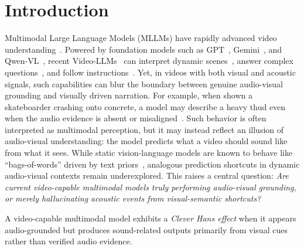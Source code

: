 \documentclass{llmxive}
\begin{document}
\section{Introduction}
\vspace{-0.5em}
Multimodal Large Language Models (MLLMs) have rapidly advanced video understanding~\cite{DBLP:conf/emnlp/LinYZCNJ024, DBLP:conf/acl/0001RKK24, DBLP:journals/tmlr/ZhangWLLMLL25}. Powered by foundation models such as GPT~\cite{DBLP:journals/corr/abs-2601-03267}, Gemini~\cite{deepmind2026gemini3}, and Qwen-VL~\cite{DBLP:journals/corr/abs-2511-21631}, recent Video-LLMs~\cite{DBLP:conf/nips/Dai0LTZW0FH23, zhang-etal-2023-video, Li2023VideoChatCV, DBLP:journals/corr/abs-2504-10479} can interpret dynamic scenes~\cite{Fu2024BLINKML, Ren2024Location}, answer complex questions~\cite{patraucean2023perception,Li2024MVBench}, and follow instructions~\cite{Wang2024InternVideo2SV,jin2023chatunivi}. 
Yet, in videos with both visual and acoustic signals, such capabilities can blur the boundary between genuine audio-visual grounding and visually driven narration. %
For example, when shown a skateboarder crashing onto concrete, a model may describe a heavy thud even when the audio evidence is absent or misaligned~\cite{DBLP:conf/emnlp/LiDZWZW23,DBLP:conf/cvpr/GuanLWXLL0CHYM024,sung-bin2025avhbench,Cai2025DiagnosingAM}.
Such behavior is often interpreted as multimodal perception, but it may instead reflect an illusion of audio-visual understanding: the model predicts what a video should sound like from what it sees. 
While static vision-language models are known to behave like ``bags-of-words'' driven by text priors~\cite{DBLP:conf/cvpr/Tong0Z0LX24, DBLP:conf/cvpr/ThrushJBSWKR22, DBLP:conf/iclr/Yuksekgonul0KJ023}, analogous prediction shortcuts in dynamic audio-visual contexts remain underexplored. This raises a central question: \textit{Are current video-capable multimodal models truly performing audio-visual grounding, or merely hallucinating acoustic events from visual-semantic shortcuts?}

\begin{tcolorbox}[
colback=bluegray!4,
colframe=bluegray!35,
boxrule=0.5pt,
arc=2pt,
left=6pt,
right=6pt,
top=3pt,
bottom=3pt,
title=\textbf{Clever Hans Effect in Audio-Visual Grounding},
fonttitle=\small,
coltitle=black
]
\small
A video-capable multimodal model exhibits a \textit{Clever Hans effect} when it appears audio-grounded but produces sound-related outputs primarily from visual cues rather than verified audio evidence.
\end{tcolorbox}
\end{document}
